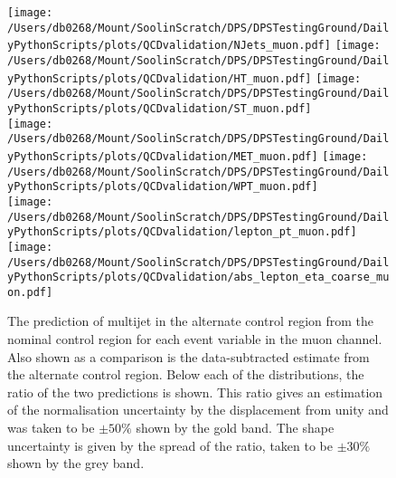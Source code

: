 \begin{figure}[p]
	\centering
	\texttt{[image: /Users/db0268/Mount/SoolinScratch/DPS/DPSTestingGround/DailyPythonScripts/plots/QCDvalidation/NJets\_muon.pdf]}
	\texttt{[image: /Users/db0268/Mount/SoolinScratch/DPS/DPSTestingGround/DailyPythonScripts/plots/QCDvalidation/HT\_muon.pdf]} 
	\texttt{[image: /Users/db0268/Mount/SoolinScratch/DPS/DPSTestingGround/DailyPythonScripts/plots/QCDvalidation/ST\_muon.pdf]} \\
	\texttt{[image: /Users/db0268/Mount/SoolinScratch/DPS/DPSTestingGround/DailyPythonScripts/plots/QCDvalidation/MET\_muon.pdf]} 
	\texttt{[image: /Users/db0268/Mount/SoolinScratch/DPS/DPSTestingGround/DailyPythonScripts/plots/QCDvalidation/WPT\_muon.pdf]} \\
	\texttt{[image: /Users/db0268/Mount/SoolinScratch/DPS/DPSTestingGround/DailyPythonScripts/plots/QCDvalidation/lepton\_pt\_muon.pdf]} 
	\texttt{[image: /Users/db0268/Mount/SoolinScratch/DPS/DPSTestingGround/DailyPythonScripts/plots/QCDvalidation/abs\_lepton\_eta\_coarse\_muon.pdf]}
	\caption[The prediction of multijet \QCD{} in the alternate control region from the nominal control region for each event variable in the muon channel. Also shown as a comparison is the data-subtracted \QCD{} estimate from the alternate control region. Below each of the distributions, the ratio of the two \QCD predictions is shown. This ratio gives an estimation of the \QCD{} normalisation uncertainty by the displacement from unity and was taken to be $\pm50\%$ shown by the gold band. The \QCD{} shape uncertainty is given by the spread of the ratio, taken to be $\pm30\%$ shown by the grey band.]{The prediction of multijet \QCD{} in the alternate control region from the nominal control region for each event variable in the muon channel. Also shown as a comparison is the data-subtracted \QCD{} estimate from the alternate control region. Below each of the distributions, the ratio of the two \QCD predictions is shown. This ratio gives an estimation of the \QCD{} normalisation uncertainty by the displacement from unity and was taken to be $\pm50\%$ shown by the gold band. The \QCD{} shape uncertainty is given by the spread of the ratio, taken to be $\pm30\%$ shown by the grey band.}
	\label{fig:QCDmuValid}
\end{figure}